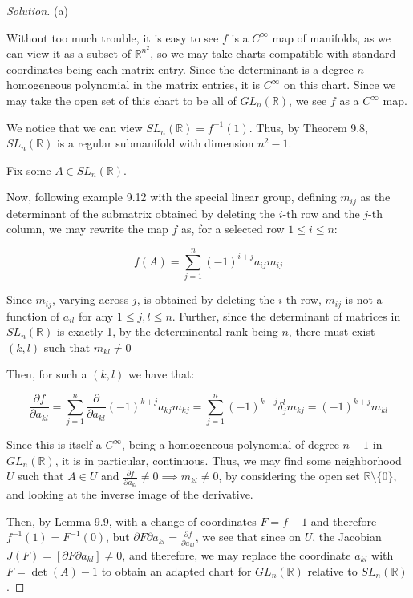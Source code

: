 \documentclass[10pt]{article}
\theoremstyle{nonumberplain}%
\begin{document}
\begin{proof}[Solution]

(a)

Without too much trouble, it is easy to see $f$ is a $C^\infty$ map of manifolds, as we can view it as a subset of $\mathbb{R}^{n^2}$, so we may take charts compatible with standard coordinates being each matrix entry. Since the determinant is a degree $n$ homogeneous polynomial in the matrix entries, it is $C^\infty$ on this chart. Since we may take the open set of this chart to be all of $GL_n(\mathbb{R})$, we see $f$ as a $C^\infty$ map.

We notice that we can view $SL_n(\mathbb{R}) = f^{-1}(1)$. Thus, by Theorem 9.8, $SL_n(\mathbb{R})$ is a regular submanifold with dimension $n^2-1$.

Fix some $A \in SL_n(\mathbb{R})$.

Now, following example 9.12 with the special linear group, defining $m_{ij}$ as the determinant of the submatrix obtained by deleting the $i$-th row and the $j$-th column, we may rewrite the map $f$ as, for a selected row $1 \leq i \leq n$:

$$f(A) = \sum_{j=1}^n (-1)^{i+j} a_{ij}m_{ij} $$

Since $m_{ij}$, varying across $j$, is obtained by deleting the $i$-th row, $m_{ij}$ is not a function of $a_{il}$ for any $1 \leq j, l \leq n$. Further, since the determinant of matrices in $SL_n(\mathbb{R})$ is exactly 1, by the determinental rank being $n$, there must exist $(k,l)$ such that $m_{kl} \not = 0$

Then, for such a $(k,l)$ we have that:

$$ \frac{\partial f}{\partial a_{kl}} =  \sum_{j=1}^n  \frac{\partial}{\partial a_{kl}} (-1)^{k+j} a_{kj}m_{kj} = \sum_{j=1}^n   (-1)^{k+j} \delta_j^l m_{kj} =  (-1)^{k+j} m_{kl}$$

Since this is itself a $C^\infty$, being a homogeneous polynomial of degree $n-1$ in $GL_n(\mathbb{R})$, it is in particular, continuous. Thus, we may find some neighborhood $U$ such that $A \in U$ and $ \frac{\partial f}{\partial a_{kl}} \not = 0 \implies m_{kl} \not = 0 $, by considering the open set $\mathbb{R} \setminus \{ 0 \}$, and looking at the inverse image of the derivative.

Then, by Lemma 9.9, with a change of coordinates $F = f - 1$ and therefore $f^{-1}(1) = F^{-1}(0)$, but $\partial{F}{\partial a_{kl}} =  \frac{\partial f}{\partial a_{kl}}$, we see that since on $U$, the Jacobian $J(F) = \left[ \partial{F}{\partial a_{kl}} \right] \not = 0$, and therefore, we may replace the coordinate $a_{kl}$ with $F = \det(A) - 1$ to obtain an adapted chart for $GL_n(\mathbb{R})$ relative to $SL_n(\mathbb{R})$.


\end{proof}
\end{document}
